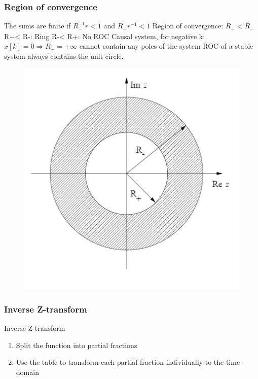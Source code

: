 \begin{frame}
\frametitle{Region of convergence}
The sums are finite if $R_{-}^{-1}r < 1$ and $R_{+}r^{-1} < 1$
Region of convergence: $R_{+} < R_{-}$
R+< R-: Ring
R-< R+: No ROC
Causal system, for negative k:
$x[k] = 0 \Rightarrow R_{-} = + \infty$
cannot contain any poles of the system
ROC of a stable system always contains
the unit circle.
\begin{figure}
\centering
\includegraphics[height=0.5\textheight]{Images/discrete_time_systems_24}
\label{fig:discrete_time_systems_24}
\end{figure}

\end{frame}
\begin{frame}
	\frametitle{Inverse Z-transform}
	\begin{block}{Inverse Z-transform}
		\begin{enumerate}
			\item Split the function into partial fractions
			\item Use the table to transform each partial fraction individually to the time domain
		\end{enumerate}
	\end{block}
	
\end{frame}
